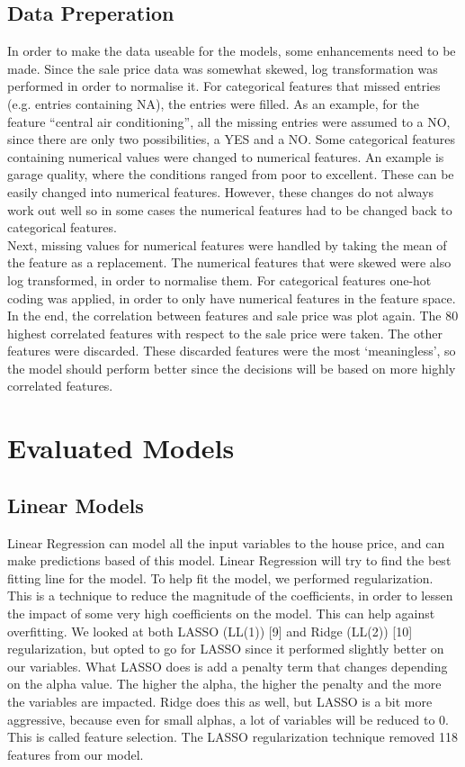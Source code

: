 \documentclass[a4paper,11pt]{article}
\begin{document}


\subsection{Data Preperation}
In order to make the data useable for the models, some enhancements need to be made. Since the sale price data was somewhat skewed, log transformation was performed in order to normalise it. For categorical features that missed entries (e.g. entries containing NA), the entries were filled. As an example, for the feature “central air conditioning”, all the missing entries were assumed to a NO, since there are only two possibilities, a YES and a NO. Some categorical features containing numerical values were changed to numerical features. An example is garage quality, where the conditions ranged from poor to excellent. These can be easily changed into numerical features. However, these changes do not always work out well so in some cases the numerical features had to be changed back to categorical features. \\
\indent Next, missing values for numerical features were handled by taking the mean of the feature as a replacement. The numerical features that were skewed were also log transformed, in order to normalise them. For categorical features one-hot coding was applied, in order to only have numerical features in the feature space. In the end, the correlation between features and sale price was plot again. The 80 highest correlated features with respect to the sale price were taken. The other features were discarded. These discarded features were the most ‘meaningless’, so the model should perform better since the decisions will be based on more highly correlated features. 


\section{Evaluated Models}
\subsection{Linear Models}
Linear Regression can model all the input variables to the house price, and can make predictions based of this model. Linear Regression will try to find the best fitting line for the model. To help fit the model, we performed regularization. This is a technique to reduce the magnitude of the coefficients, in order to lessen the impact of some very high coefficients on the model. This can help against overfitting. We looked at both LASSO (LL(1)) [9] and Ridge (LL(2)) [10] regularization, but opted to go for LASSO since it performed slightly better on our variables. What LASSO does is add a penalty term that changes depending on the alpha value. The higher the alpha, the higher the penalty and the more the variables are impacted. Ridge does this as well, but LASSO is a bit more aggressive, because even for small alphas, a lot of variables will be reduced to 0. This is called feature selection.  The LASSO regularization technique removed 118 features from our model. 
\end{document}
